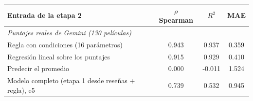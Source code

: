 \begin{tabular}{lccc}
\toprule
Entrada de la etapa 2 & $\rho$ Spearman & $R^2$ & MAE \\
\midrule
\multicolumn{4}{l}{\emph{Puntajes reales de Gemini (130 películas)}} \\
Regla con condiciones (16 parámetros) & 0.943 & 0.937 & 0.359 \\
Regresión lineal sobre los puntajes & 0.915 & 0.929 & 0.410 \\
Predecir el promedio & 0.000 & -0.011 & 1.524 \\
\midrule
Modelo completo (etapa 1 desde reseñas + regla), e5 & 0.739 & 0.532 & 0.945 \\
\bottomrule
\end{tabular}

